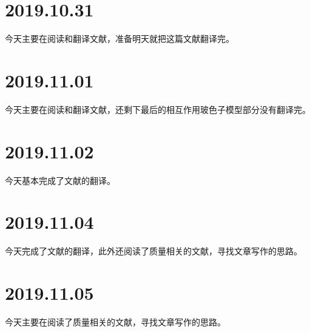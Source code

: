 \section{2019.10.31}
今天主要在阅读和翻译文献\cite{RN1176}，准备明天就把这篇文献翻译完。

\section{2019.11.01}
今天主要在阅读和翻译文献\cite{RN1176}，还剩下最后的相互作用玻色子模型部分没有翻译完。

\section{2019.11.02}
今天基本完成了文献\cite{RN1176}的翻译。

\section{2019.11.04}
今天完成了文献\cite{RN1176}的翻译，此外还阅读了质量相关的文献，寻找文章写作的思路。

\section{2019.11.05}
今天主要在阅读了质量相关的文献，寻找文章写作的思路。